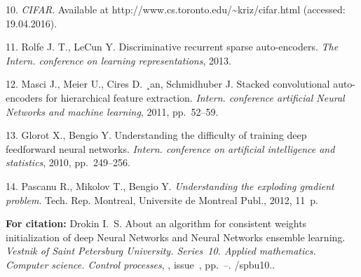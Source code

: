 {10. \textit{CIFAR}. Available at
http://www.cs.toronto.edu/\~{}kriz/cifar.html (accessed:
19.04.2016).

11. Rolfe J. T., LeCun Y. Discriminative recurrent sparse
auto-encoders. \textit{The Intern. conference on learning
representations}, 2013.

12. Masci J., Meier U., Cires D. ¸an, Schmidhuber J. Stacked
convolutional auto-encoders for hierarchical feature extraction.
\textit{Intern. conference artificial Neural Networks and machine
learning}, 2011, pp.~52--59.


13. Glorot X., Bengio Y. Understanding the difficulty of training
deep feedforward neural networks. \textit{Intern. conference on
artificial intelligence and statistics}, 2010, pp.~249--256.

14. Pascanu R., Mikolov T., Bengio Y. {\it Understanding the
exploding gradient problem}. Tech. Rep. Montreal, Universite de
Montreal Publ., 2012, 11~p.



\vskip 2mm

{\bf For citation:} Drokin I.~S. About an algorithm for consistent
weights initialization of deep Neural Networks and Neural Networks
ensemble learning. {\it Vestnik of Saint Petersburg University.
Series~10. Applied mathematics. Computer science. Control
processes}, \issueyear, issue~\issuenum,
pp.~\pageref{p6}--\pageref{p6e}.
\doivyp/spbu10.\issueyear.


}
